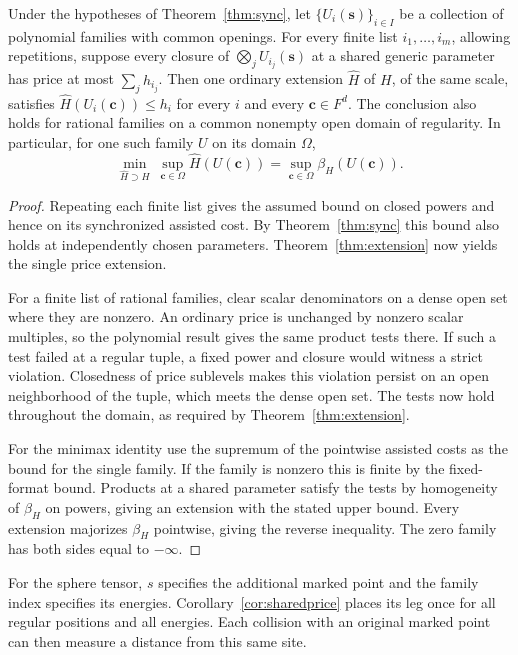 \begin{corollary}\label{cor:sharedprice}
Under the hypotheses of Theorem~\ref{thm:sync}, let
$\{U_i(\mathbf s)\}_{i\in I}$ be a collection of polynomial families
with common openings. For every finite list $i_1,\ldots,i_m$,
allowing repetitions, suppose every closure of
$\bigotimes_j U_{i_j}(\mathbf s)$ at a shared generic parameter has
price at most $\sum_j h_{i_j}$. Then one ordinary extension
$\widehat H$ of $H$, of the same scale, satisfies
$\widehat H(U_i(\mathbf c))\le h_i$ for every $i$ and every
$\mathbf c\in F^d$. The conclusion also holds for rational families
on a common nonempty open domain of regularity. In particular, for
one such family $U$ on its domain $\Omega$,
\[
 \min_{\widehat H\supset H}\ \sup_{\mathbf c\in\Omega}\widehat H(U(\mathbf c))
    =\sup_{\mathbf c\in\Omega}\beta_H(U(\mathbf c)).
\]
\end{corollary}

\begin{proof}
Repeating each finite list gives the assumed bound on closed powers
and hence on its synchronized assisted cost. By Theorem~\ref{thm:sync}
this bound also holds at independently chosen parameters.
Theorem~\ref{thm:extension} now yields the single price extension.

For a finite list of rational families, clear scalar denominators on a
dense open set where they are nonzero. An ordinary price is unchanged
by nonzero scalar multiples, so the polynomial result gives the same
product tests there. If such a test failed at a regular tuple, a
fixed power and closure would witness a strict violation. Closedness
of price sublevels makes this violation persist on an open neighborhood
of the tuple, which meets the dense open set. The tests now hold
throughout the domain, as required by Theorem~\ref{thm:extension}.

For the minimax identity use the supremum of the pointwise assisted
costs as the bound for the single family. If the family is
nonzero this is finite by the fixed-format bound. Products at a
shared parameter satisfy the tests by homogeneity of $\beta_H$ on
powers, giving an extension with the stated upper bound. Every
extension majorizes $\beta_H$ pointwise, giving the reverse inequality.
The zero family has both sides equal to $-\infty$.
\end{proof}

For the sphere tensor, $s$ specifies the additional marked point and
the family index specifies its energies. Corollary~\ref{cor:sharedprice}
places its leg once for all regular positions and all energies. Each
collision with an original marked point can then measure a distance
from this same site.
